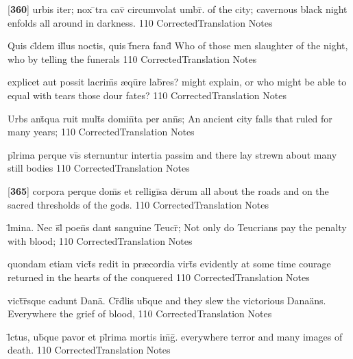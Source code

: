 \latline
  {[\textbf{360}] urbis iter; nox \={}tra cav\={} circumvolat umbr\={}.}
  { of the city; cavernous black night enfolds all around in darkness. }
  {110}
  { CorrectedTranslation }
  { Notes }


\latline
  {Quis cl\={}dem ill\={\macron {\i}}us noctis, quis f\={}nera fand\={}}
  { Who of those men slaughter of the night, who by telling the funerals }
  {110}
  { CorrectedTranslation }
  { Notes }


\latline
  {explicet aut possit lacrim\={\macron {\i}}s {\ae}qu\={}re lab\={}res?}
  { might explain, or who might be able to equal with tears those dour fates? }
  {110}
  { CorrectedTranslation }
  { Notes }


\latline
  {Urbs ant\={\macron {\i}}qua ruit mult\={}s domin\={}ta per ann\={}s;}
  { An ancient city falls that ruled for many years;  }
  {110}
  { CorrectedTranslation }
  { Notes }


\latline
  {pl\={}rima perque vi\={}s sternuntur intertia passim}
  { and there lay strewn about many still bodies }
  {110}
  { CorrectedTranslation }
  { Notes }


\latline
  {[\textbf{365}] corpora perque dom\={}s et relligi\={}sa de\={}rum}
  { all about the roads and on the sacred thresholds of the gods. }
  {110}
  { CorrectedTranslation }
  { Notes }


\latline
  {l\={\macron {\i}}mina.  Nec s\={}l\={\macron {\i}} poen\={}s dant sanguine Teucr\={\macron {\i}};}
  { Not only do Teucrians pay the penalty with blood; }
  {110}
  { CorrectedTranslation }
  { Notes }


\latline
  {quondam etiam vict\={\macron {\i}}s redit in pr{\ae}cordia virt\={}s}
  { evidently at some time courage returned in the hearts of the conquered }
  {110}
  { CorrectedTranslation }
  { Notes }


\latline
  {vict\={}r\={}sque cadunt Dana\={\macron {\i}}.  Cr\={}d\={}lis ub\={\macron {\i}}que}
  { and they slew the victorious Dana\"ans.  Everywhere the grief of blood,  }
  {110}
  { CorrectedTranslation }
  { Notes }


\latline
  {l\={}ctus, ub\={\macron {\i}}que pavor et pl\={}rima mortis im\={}g\={}.}
  { everywhere terror and many images of death. }
  {110}
  { CorrectedTranslation }
  { Notes }


